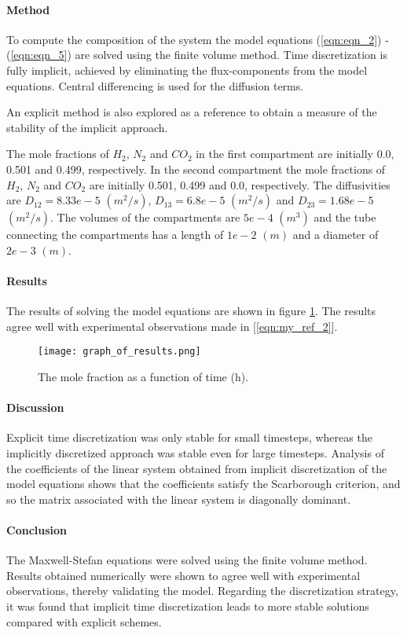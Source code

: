\documentclass[twocolumn]{article}
\begin{document}
\paragraph*{Method}
To compute the composition of the system the model equations (\ref{eqn:eqn_2}) - (\ref{eqn:eqn_5}) are solved using the finite volume method. Time discretization is fully implicit, achieved by eliminating the flux-components from the model equations. Central differencing is used for the diffusion terms.

An explicit method is also explored as a reference to obtain a measure of the stability of the implicit approach.

The mole fractions of $H_2$, $N_2$ and $CO_2$ in the first compartment are initially 0.0, 0.501 and 0.499, respectively. In the second compartment the mole fractions of $H_2$, $N_2$ and $CO_2$ are initially 0.501, 0.499 and 0.0, respectively. The diffusivities are $D_{12} = 8.33e-5$  $(m^2/s)$, $D_{13} = 6.8e-5$ $(m^2/s)$ and $D_{23} = 1.68e-5$ $(m^2/s)$. The volumes of the compartments are $5e-4$ $(m^3)$ and the tube connecting the compartments has a length of $1e-2$ $(m)$ and a diameter of $2e-3$ $(m)$. 

\paragraph*{Results} 
The results of solving the model equations are shown in figure \ref{fig:fig_1}. The results agree well with experimental observations made in [\ref{eqn:my_ref_2}].

\begin{figure}
\texttt{[image: graph\_of\_results.png]}
\caption{The mole fraction as a function of time (h).}
\label{fig:fig_1}
\end{figure}

\paragraph*{Discussion}
Explicit time discretization was only stable for small timesteps, whereas the implicitly discretized approach was stable even for large timesteps. Analysis of the coefficients of the linear system obtained from implicit discretization of the model equations shows that the coefficients satisfy the Scarborough criterion, and so the matrix associated with the linear system is diagonally dominant.

\paragraph*{Conclusion}
The Maxwell-Stefan equations were solved using the finite volume method. Results obtained numerically were shown to agree well with experimental observations, thereby validating the model. Regarding the discretization strategy, it was found that implicit time discretization leads to more stable solutions compared with explicit schemes. 
\end{document}
